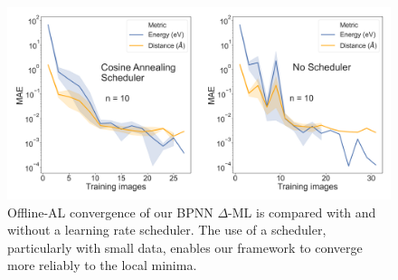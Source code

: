 \documentclass[
 reprint,
 amsmath,amssymb,
 aps,
]{revtex4-1}
\begin{document}
\begin{figure}
    \centering
    \includegraphics[width=\textwidth]{figures/figure_s3.pdf}
    \caption{Offline-AL convergence of our BPNN $\Delta$-ML is compared with and without a learning rate scheduler. The use of a scheduler, particularly with small data, enables our framework to converge more reliably to the local minima.}
    \label{fig:scheduler}
\end{figure}
\end{document}
